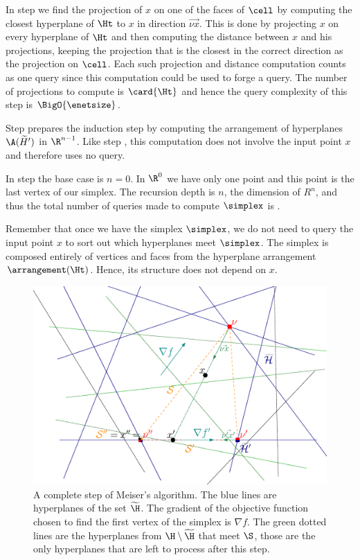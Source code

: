 In step  we find the projection of $x$ on one of the faces of
$\cell$ by computing the closest hyperplane of $\Ht$ to $x$ in direction
$\vec{\nu x}$. This is done by projecting $x$ on every hyperplane of $\Ht$ and
then computing the distance between $x$ and his projections, keeping the
projection that is the closest in the correct direction as the projection
on $\cell$. Each such projection and distance computation counts as one query
since this computation could be used to forge a query. The number of
projections to compute is \(\card{\Ht}\) and hence the query complexity of this
step is $\BigO{\enetsize}$.

Step  prepares the induction step by computing the arrangement of
hyperplanes \(\A(\widetilde{H}')\) in \(\R^{n-1}\). Like step , this
computation does not involve the input point \(x\) and therefore uses no query.

In step  the base case is $n = 0$. In $\R^0$ we have only one point
and this point is the last vertex of our simplex.
The recursion depth is $n$, the dimension of $R^n$, and thus the total number
of queries made to compute $\simplex$ is .

Remember that once we have the simplex $\simplex$, we do not need to query the
input point $x$ to sort out which hyperplanes meet $\simplex$. The simplex is
composed entirely of vertices and faces from the hyperplane arrangement
$\arrangement(\Ht)$. Hence, its structure does not depend on $x$.

\begin{figure}
\begin{center}
\includegraphics[trim=110 40 50 30,clip=true,height=0.3\textheight]{fig/point-location/simplex.eps}
\caption{
A complete step of Meiser's algorithm. The blue lines are hyperplanes of the
set \(\widetilde{\H}\). The gradient of the objective function
chosen to find the first vertex of the simplex is \(\nabla f\). The green dotted lines are the
hyperplanes from \(\H \setminus \widetilde{\H}\) that meet \(\S\), those are
the only hyperplanes that are left to process after this step.
}
\label{fig:meiser:step}
\end{center}
\end{figure}

